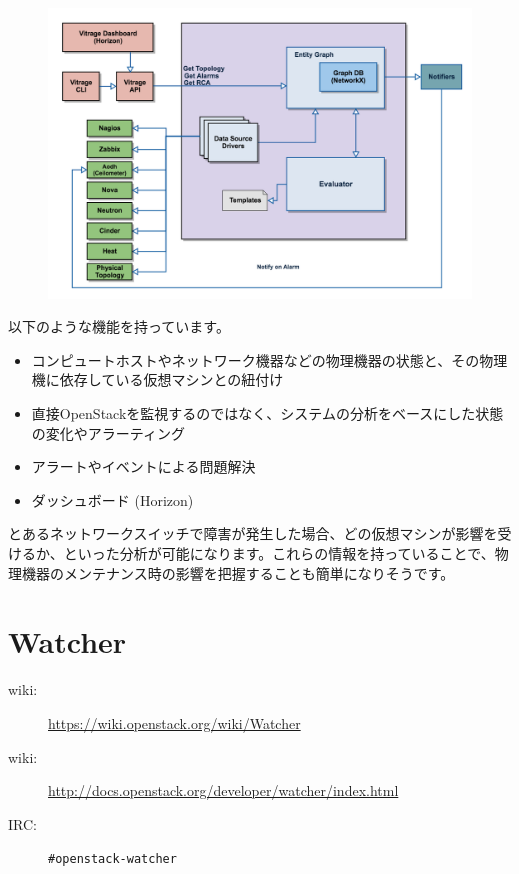 \begin{figure}[b]
	\begin{center}
		\includegraphics[width=\textwidth]{img/Vitrage-high_level_architecture2.png}
	\end{center}
\end{figure}

以下のような機能を持っています。

\begin{itemize}
	\item コンピュートホストやネットワーク機器などの物理機器の状態と、その物理機に依存している仮想マシンとの紐付け
	\item 直接OpenStackを監視するのではなく、システムの分析をベースにした状態の変化やアラーティング
	\item アラートやイベントによる問題解決
	\item ダッシュボード (Horizon)
\end{itemize}

とあるネットワークスイッチで障害が発生した場合、どの仮想マシンが影響を受けるか、といった分析が可能になります。これらの情報を持っていることで、物理機器のメンテナンス時の影響を把握することも簡単になりそうです。

\section{Watcher}

\begin{description}
	\item[wiki:] \url{https://wiki.openstack.org/wiki/Watcher}
	\item[wiki:] \url{http://docs.openstack.org/developer/watcher/index.html}
	\item[IRC:] \verb|#openstack-watcher|
\end{description}

